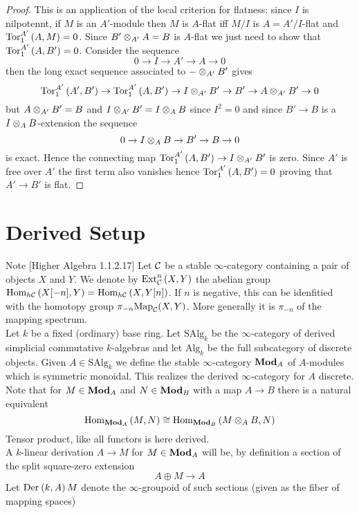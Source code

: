 \documentclass[12pt]{article}
\begin{document}
\begin{proof}
This is an application of the local criterion for flatness: since $I$ is nilpotennt, if $M$ is an $A'$-module then $M$ is $A$-flat iff $M/I$ is $A = A'/I$-flat and $\mathrm{Tor}^{A'}_{1} \left( A, M \right) = 0$. Since $B' \otimes_{A'} A = B$ is $A$-flat we just need to show that $\mathrm{Tor}^{A'}_{1} \left( A, B' \right) = 0$. Consider the sequence
\[ 0 \to I \to A' \to A \to 0 \]
then the long exact sequence associated to $- \otimes_{A'} B'$ gives
\[ \mathrm{Tor}^{A'}_{1} \left( A', B' \right) \to \mathrm{Tor}^{A'}_{1} \left( A, B' \right) \to I \otimes_{A'} B' \to B' \to A \otimes_{A'} B' \to 0 \]
but $A \otimes_{A'} B' = B$ and $I \otimes_{A'} B' = I \otimes_{A} B$ since $I^2 = 0$ and since $B' \to B$ is a $I \otimes_A B$-extension the sequence
\[ 0 \to I \otimes_A B \to B' \to B \to 0 \]
is exact. Hence the connecting map $\mathrm{Tor}^{A'}_{1} \left( A, B' \right) \to I \otimes_{A'} B'$ is zero. Since $A'$ is free over $A'$ the first term also vanishes hence $\mathrm{Tor}^{A'}_{1} \left( A, B' \right) = 0$ proving that $A' \to B'$ is flat.
\end{proof}

\section{Derived Setup}

\newcommand{\Alg}{\mathrm{Alg}}
\newcommand{\SAlg}{\mathrm{SAlg}}
\newcommand{\Map}{\mathrm{Map}}
\newcommand{\cQ}{\mathcal{Q}}

Note [Higher Algebra 1.1.2.17] Let $\mathcal{C}$ be a stable $\infty$-category containing a pair of objects $X$ and $Y$. We denote by $\mathrm{Ext}^{n}_{\mathcal{C}} \left( X, Y \right)$ the abelian group $\mathrm{Hom}_{h\mathcal{C}} \left( X[-n], Y \right) = \mathrm{Hom}_{h\mathcal{C}} \left( X, Y[n] \right)$. If $n$ is negative, this can be idenfitied with the homotopy group $\pi_{-n} \Map_{\C}(X,Y)$. More generally it is $\pi_{-n}$ of the mapping spectrum.
\bigskip\\
Let $k$ be a fixed (ordinary) base ring. Let $\SAlg_k$ be the $\infty$-category of derived simplicial commutative $k$-algebras and let $\Alg_k$ be the full subcategory of discrete objects. Given $A \in \SAlg_k$ we define the stable $\infty$-category $\mathbf{Mod}_{A}$ of $A$-modules which is symmetric monoidal. This realizes the derived $\infty$-category for $A$ discrete. Note that for $M \in \mathbf{Mod}_{A}$ and $N \in \mathbf{Mod}_{B}$ with a map $A \to B$ there is a natural equivalent
\[ \mathrm{Hom}_{\mathbf{Mod}_{A}} \left( M, N \right) \cong \mathrm{Hom}_{\mathbf{Mod}_{B}} \left( M \otimes_A B, N \right) \]
Tensor product, like all functors is here derived.
\bigskip\\
A $k$-linear derivation $A \to M$ for $M \in \mathbf{Mod}_{A}$ will be, by definition a section of the split square-zero extension
\[ A \oplus M \to A \]
Let $\mathrm{Der}_{} \left( k, A \right){M}$ denote the $\infty$-groupoid of such sections (given as the fiber of mapping spaces)
\end{document}

